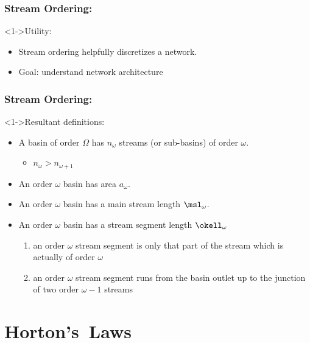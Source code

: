 \begin{frame}[label=]
  \frametitle{Stream Ordering:}

  \begin{block}<1->{Utility:}
    \begin{itemize}
    \item<2-> Stream ordering helpfully discretizes a network.
    \item<3-> Goal: understand \alert{network architecture}
    \end{itemize}
  \end{block}

\end{frame}

\begin{frame}[label=]
  \frametitle{Stream Ordering:}


  \begin{block}<1->{Resultant definitions:}
    \begin{itemize}
    \item <1->
      A basin of order $\Omega$ has 
      \alert{$n_\omega$} streams (or sub-basins) of order $\omega$.
      \begin{itemize}
      \item<2-> $n_\omega > n_{\omega+1}$
      \end{itemize}
    \item <3->
      An order $\omega$ basin has \alert{area $a_\omega$}.
    \item <4->
      An order $\omega$ basin has a \alert{main stream length $\msl_\omega$}.
    \item <5-> 
      An order $\omega$ basin has a \alert{stream segment length $\okell_\omega$}
      \begin{enumerate}
      \item<6-> an order $\omega$ stream segment is only that part of the stream which is actually of order $\omega$
      \item<7-> an order $\omega$ stream segment runs from the 
        basin outlet up to the junction of two order $\omega-1$ streams
      \end{enumerate}
    \end{itemize}
  \end{block}

\end{frame}

\section{Horton's\ Laws}

